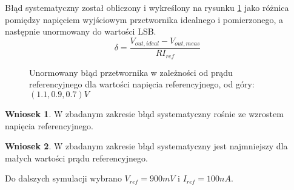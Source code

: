 \documentclass[10pt,a4paper,twoside]{report}
\theoremstyle{definition}
\theoremstyle{definition}
\theoremstyle{definition}
\theoremstyle{definition}
\theoremstyle{definition}
\newtheorem{wniosek}{Wniosek}[section]
\begin{document}
{{{	Błąd systematyczny został obliczony i wykreślony na rysunku \ref{i_u_delta2} jako różnica pomiędzy napięciem wyjściowym przetwornika idealnego i pomierzonego, a następnie unormowany do wartości LSB.
		\begin{equation}
			\delta = \frac{V_{out,ideal} - V_{out,meas}}{R I_{ref}}
		\end{equation}
	}		
		
	\begin{figure}[!ht]
		\centering
		\caption{Unormowany błąd przetwornika w zależności od prądu referencyjnego dla wartości napięcia referencyjnego, od góry: $(1.1,0.9,0.7)V$}
		\label{i_u_delta2}
	\end{figure}
	
	\begin{wniosek}{W zbadanym zakresie błąd systematyczny rośnie ze wzrostem napięcia referencyjnego.}
	\end{wniosek}

	\begin{wniosek}{W zbadanym zakresie błąd systematyczny jest najmniejszy dla małych wartości prądu referencyjnego.}
	\end{wniosek}

	{	Do dalszych symulacji wybrano $V_{ref} = 900mV$ i $I_{ref} = 100nA$. }


}}
\end{document}
